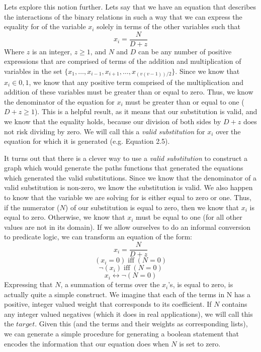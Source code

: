 \documentclass[11pt,a4paper]{report}
\begin{document}
Lets explore this notion further.  
Lets say that we have an equation that describes the interactions of the binary relations in such a way that we can express the equality for of the variable 
$x_i$ solely in terms of the other variables such that $$x_i = \frac{N}{D + z}$$ Where $z$ is an integer, $z \geq 1$, and $N$ and $D$ 
can be any number of positive expressions that are comprised of terms of the addition and multiplication of variables in the set 
$\{x_1, \dots,  x_{i-1},x_{i+1}, \dots, x_{(v(v-1))/2}\}$.  Since we know that $x_i \in {0,1}$, we know that any positive term comprised of the multiplication and addition of these variables must be greater than or equal to zero.  
Thus, we know the denominator of the equation for $x_i$ must be greater than or equal to one ($D + z \geq 1$). 
This is a helpful result, as it means that our substitution is valid, and we know that the equality holds, because our division of both sides by $D + z$ 
does not risk dividing by zero.  We will call this a \emph{valid substitution} for $x_i$ over the equation for which it is generated (e.g. Equation 2.5). 

It turns out that there is a clever way to use a \emph{valid substitution} to construct a graph which would generate the paths functions that generated the equations which generated the valid substitutions.
Since we know that the denominator of a valid substitution is non-zero, we know the substitution is valid.  
We also happen to know that the variable we are solving for is either equal to zero or one.  
Thus, if the numerator ($N$) of our substitution is equal to zero, then we know that $x_i$ is equal to zero.  
Otherwise, we know that $x_i$ must be equal to one (for all other values are not in its domain). 
If we allow ourselves to do an informal conversion to predicate logic, we can transform an equation of the form:
 $$x_i = \frac{N}{D + z}$$ 
 $$(x_i = 0) \; \text{iff} \; (N = 0)$$
 $$\neg(x_i) \; \text{iff} \; (N = 0)$$
 $$x_i  \leftrightarrow  \neg(N = 0)$$
Expressing that $N$, a summation of terms over the $x_i$'s, is equal to zero, is actually quite a simple construct. 
We imagine that each of the terms in N has a positive, integer valued weight that corresponds to its coefficient. 
If $N$ contains any integer valued negatives (which it does in real applications), we will call this the $target$.
Given this (and the terms and their weights as corresponding lists), we can generate a simple procedure for generating a boolean statement that encodes the information that our equation does when $N$ is set to zero.
\end{document}
